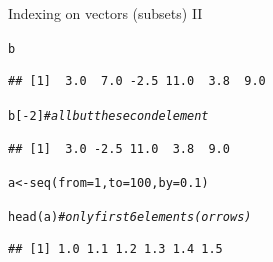 \documentclass[xcolor=table,           xcolor=dvipsnames]{beamer}\usepackage[]{graphicx}\usepackage[]{color}
\makeatletter
\newcommand{\hlnum}[1]{\textcolor[rgb]{0,0,0}{#1}}
\newcommand{\hlcom}[1]{\textcolor[rgb]{0,0.392,0}{\textit{#1}}}
\newcommand{\hlopt}[1]{\textcolor[rgb]{0,0,0}{#1}}
\newcommand{\hlstd}[1]{\textcolor[rgb]{0,0,0}{#1}}
\newcommand{\hlkwb}[1]{\textcolor[rgb]{0,0,0}{#1}}
\newcommand{\hlkwc}[1]{\textcolor[rgb]{1,0,1}{#1}}
\newcommand{\hlkwd}[1]{\textcolor[rgb]{0,0,1}{#1}}
\newenvironment{kframe}{%
 \def\at@end@of@kframe{}%
 \ifinner\ifhmode%
  \def\at@end@of@kframe{\end{minipage}}%
  \begin{minipage}{\columnwidth}%
 \fi\fi%
 \def\FrameCommand##1{\hskip\@totalleftmargin \hskip-\fboxsep
 \colorbox{shadecolor}{##1}\hskip-\fboxsep
     \hskip-\linewidth \hskip-\@totalleftmargin \hskip\columnwidth}%
 \MakeFramed {\advance\hsize-\width
   \@totalleftmargin\z@ \linewidth\hsize
   \@setminipage}}%
 {\par\unskip\endMakeFramed%
 \at@end@of@kframe}
\newenvironment{knitrout}{}{} %
\makeatother
\begin{document}
\begin{frame}[fragile]{Indexing on vectors (subsets) II}
\begin{knitrout}
\color{fgcolor}\begin{kframe}
\begin{alltt}
\hlstd{b}
\end{alltt}
\begin{verbatim}
## [1]  3.0  7.0 -2.5 11.0  3.8  9.0
\end{verbatim}
\begin{alltt}
\hlstd{b[}\hlopt{-}\hlnum{2}\hlstd{]} \hlcom{# all but the second element}
\end{alltt}
\begin{verbatim}
## [1]  3.0 -2.5 11.0  3.8  9.0
\end{verbatim}
\end{kframe}
\end{knitrout}
\begin{knitrout}
\color{fgcolor}\begin{kframe}
\begin{alltt}
\hlstd{a} \hlkwb{<-} \hlkwd{seq}\hlstd{(}\hlkwc{from}\hlstd{=}\hlnum{1}\hlstd{,} \hlkwc{to}\hlstd{=}\hlnum{100}\hlstd{,} \hlkwc{by}\hlstd{=}\hlnum{0.1}\hlstd{)}

\hlkwd{head}\hlstd{(a)} \hlcom{# only first 6 elements (or rows)}
\end{alltt}
\begin{verbatim}
## [1] 1.0 1.1 1.2 1.3 1.4 1.5
\end{verbatim}
\end{kframe}
\end{knitrout}
\end{frame}

\end{document}
